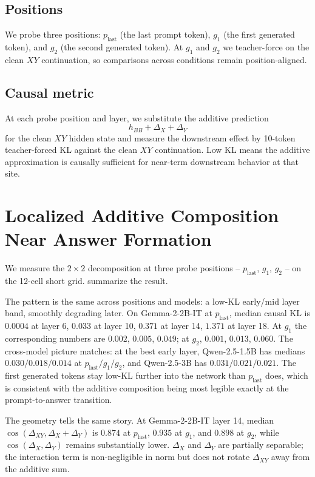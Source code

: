 \documentclass[11pt]{article}
\begin{document}
\subsection{Positions}

We probe three positions: $p_{\text{last}}$ (the last prompt token), $g_1$ (the first generated token), and $g_2$ (the second generated token). At $g_1$ and $g_2$ we teacher-force on the clean $XY$ continuation, so comparisons across conditions remain position-aligned.

\subsection{Causal metric}

At each probe position and layer, we substitute the additive prediction
\[
h_{BB} + \Delta_X + \Delta_Y
\]
for the clean $XY$ hidden state and measure the downstream effect by 10-token teacher-forced KL against the clean $XY$ continuation. Low KL means the additive approximation is causally sufficient for near-term downstream behavior at that site.

\section{Localized Additive Composition Near Answer Formation}
\label{sec:localized}

We measure the $2\times2$ decomposition at three probe positions -- $p_{\text{last}}$, $g_1$, $g_2$ -- on the 12-cell short grid.  summarize the result.

The pattern is the same across positions and models: a low-KL early/mid layer band, smoothly degrading later. On Gemma-2-2B-IT at $p_{\text{last}}$, median causal KL is $0.0004$ at layer 6, $0.033$ at layer 10, $0.371$ at layer 14, $1.371$ at layer 18. At $g_1$ the corresponding numbers are $0.002$, $0.005$, $0.049$; at $g_2$, $0.001$, $0.013$, $0.060$. The cross-model picture matches: at the best early layer, Qwen-2.5-1.5B has medians $0.030 / 0.018 / 0.014$ at $p_{\text{last}}/g_1/g_2$, and Qwen-2.5-3B has $0.031 / 0.021 / 0.021$. The first generated tokens stay low-KL further into the network than $p_{\text{last}}$ does, which is consistent with the additive composition being most legible exactly at the prompt-to-answer transition.

The geometry tells the same story. At Gemma-2-2B-IT layer 14, median $\cos(\Delta_{XY}, \Delta_X+\Delta_Y)$ is $0.874$ at $p_{\text{last}}$, $0.935$ at $g_1$, and $0.898$ at $g_2$, while $\cos(\Delta_X,\Delta_Y)$ remains substantially lower. $\Delta_X$ and $\Delta_Y$ are partially separable; the interaction term is non-negligible in norm but does not rotate $\Delta_{XY}$ away from the additive sum.
\end{document}
